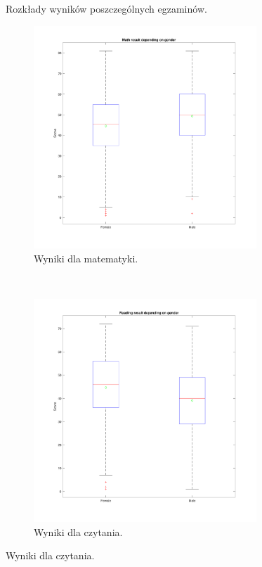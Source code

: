 \documentclass[12pt]{article}
\begin{document}
\begin{figure}[H]
\caption{Rozkłady wyników poszczególnych egzaminów.} \label{fig:histograms}
\end{figure}


\begin{figure}[H]
\centering
\begin{subfigure}[t]{0.48\textwidth} 
\centering
\includegraphics[height=3.3in]{math_score_per_gender.pdf}
\caption{Wyniki dla matematyki.}
\end{subfigure}
~~
\begin{subfigure}[t]{0.48\textwidth} 
\centering
\includegraphics[height=3.3in]{reading_score_per_gender.pdf}
\caption{Wyniki dla czytania.}
\end{subfigure}


\end{figure}
\end{document}
